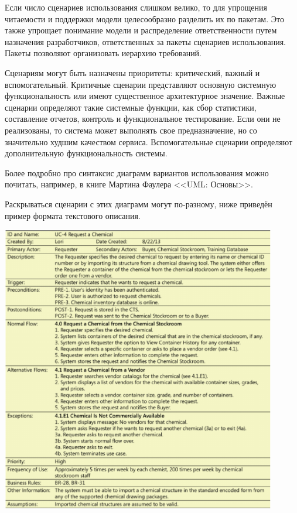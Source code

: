 \documentclass{../../text-style}
\begin{document}
Если число сценариев использования слишком велико, то для упрощения читаемости и поддержки модели целесообразно разделить их по пакетам. Это также упрощает понимание модели и распределение ответственности путем назначения разработчиков, ответственных за пакеты сценариев использования. Пакеты позволяют организовать иерархию требований.

Сценариям могут быть назначены приоритеты: критический, важный и вспомогательный. Критичные сценарии представляют основную системную функциональность или имеют существенное архитектурное значение. Важные сценарии определяют такие системные функции, как сбор статистики, составление отчетов, контроль и функциональное тестирование. Если они не реализованы, то система может выполнять свое предназначение, но со значительно худшим качеством сервиса. Вспомогательные сценарии определяют дополнительную функциональность системы.

Более подробно про синтаксис диаграмм вариантов использования можно почитать, например, в книге Мартина Фаулера <<UML: Основы>>.

Раскрываться сценарии с этих диаграмм могут по-разному, ниже приведён пример формата текстового описания.

\begin{center}
    \includegraphics[width=0.9\textwidth]{userScenarioFull.png}
\end{center}
\end{document}

